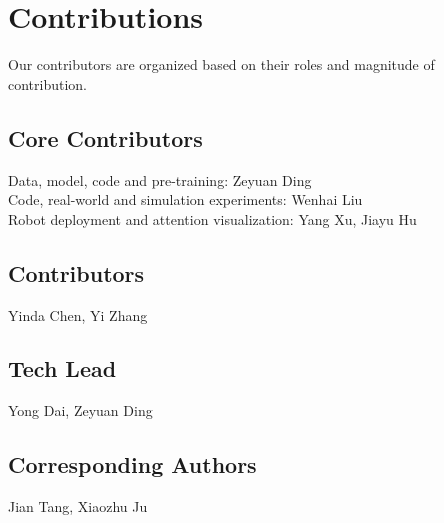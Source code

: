 \documentclass[a4paper,table]{extarticle}
\begin{document}
\pagebreak
\section{Contributions}\label{contributions}
Our contributors are organized based on their roles and magnitude of contribution.
\subsection{Core Contributors}
Data, model, code and pre-training: Zeyuan Ding \\
Code, real-world and simulation experiments: Wenhai Liu\\
Robot deployment and attention visualization: Yang Xu, Jiayu Hu 

\subsection{Contributors}
Yinda Chen, Yi Zhang
\subsection{Tech Lead}
Yong Dai, Zeyuan Ding
\subsection{Corresponding Authors}
Jian Tang, Xiaozhu Ju
\end{document}
